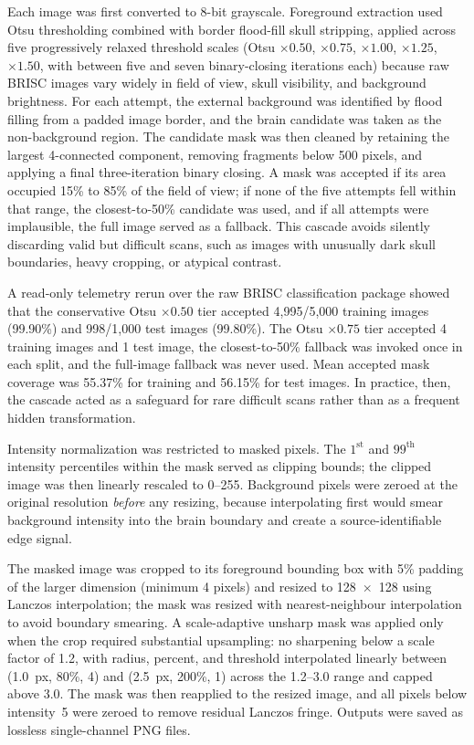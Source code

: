 \documentclass[conference,twoside]{IEEEtran}
\begin{document}
Each image was first converted to 8-bit grayscale. Foreground extraction used Otsu thresholding combined with border flood-fill skull stripping, applied across five progressively relaxed threshold scales (Otsu $\times 0.50$, $\times 0.75$, $\times 1.00$, $\times 1.25$, $\times 1.50$, with between five and seven binary-closing iterations each) because raw BRISC images vary widely in field of view, skull visibility, and background brightness. For each attempt, the external background was identified by flood filling from a padded image border, and the brain candidate was taken as the non-background region. The candidate mask was then cleaned by retaining the largest 4-connected component, removing fragments below 500 pixels, and applying a final three-iteration binary closing. A mask was accepted if its area occupied 15\% to 85\% of the field of view; if none of the five attempts fell within that range, the closest-to-50\% candidate was used, and if all attempts were implausible, the full image served as a fallback. This cascade avoids silently discarding valid but difficult scans, such as images with unusually dark skull boundaries, heavy cropping, or atypical contrast.

A read-only telemetry rerun over the raw BRISC classification package showed that the conservative Otsu $\times 0.50$ tier accepted 4,995/5,000 training images (99.90\%) and 998/1,000 test images (99.80\%). The Otsu $\times 0.75$ tier accepted 4 training images and 1 test image, the closest-to-50\% fallback was invoked once in each split, and the full-image fallback was never used. Mean accepted mask coverage was 55.37\% for training and 56.15\% for test images. In practice, then, the cascade acted as a safeguard for rare difficult scans rather than as a frequent hidden transformation.

Intensity normalization was restricted to masked pixels. The $1^{\mathrm{st}}$ and $99^{\mathrm{th}}$ intensity percentiles within the mask served as clipping bounds; the clipped image was then linearly rescaled to 0--255. Background pixels were zeroed at the original resolution \emph{before} any resizing, because interpolating first would smear background intensity into the brain boundary and create a source-identifiable edge signal.

The masked image was cropped to its foreground bounding box with 5\% padding of the larger dimension (minimum 4 pixels) and resized to 128~$\times$~128 using Lanczos interpolation; the mask was resized with nearest-neighbour interpolation to avoid boundary smearing. A scale-adaptive unsharp mask was applied only when the crop required substantial upsampling: no sharpening below a scale factor of 1.2, with radius, percent, and threshold interpolated linearly between (1.0~px, 80\%, 4) and (2.5~px, 200\%, 1) across the 1.2--3.0 range and capped above 3.0. The mask was then reapplied to the resized image, and all pixels below intensity~5 were zeroed to remove residual Lanczos fringe. Outputs were saved as lossless single-channel PNG files.
\end{document}
